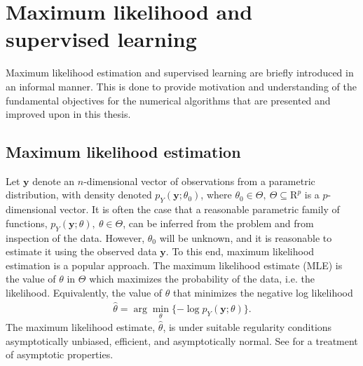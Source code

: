 \chapter{Maximum likelihood and supervised learning}
\label{chap:ml-and-sl}

Maximum likelihood estimation and supervised learning are briefly introduced in an informal manner. %
This is done to provide motivation and understanding of the fundamental objectives for the numerical algorithms that are presented and improved upon in this thesis.


\section{Maximum likelihood estimation}

Let $\mathbf{y}$ denote an $n$-dimensional vector of observations from a parametric distribution, with density denoted $p_Y(\mathbf{y};\theta_0)$, where $\theta_0\in \Theta,~\Theta\subseteq \mathrm{R}^p$ is a $p$-dimensional vector.
It is often the case that a reasonable parametric family of functions, $p_Y(\mathbf{y};\theta),~\theta\in \Theta$, can be inferred from the problem and from inspection of the data.
However, $\theta_0$ will be unknown, and it is reasonable to estimate it using the observed data $\mathbf{y}$.
To this end, maximum likelihood estimation is a popular approach.
The maximum likelihood estimate (MLE) is the value of $\theta$ in $\Theta$ which maximizes the probability of the data, i.e. the likelihood.
Equivalently, the value of $\theta$ that minimizes the negative log likelihood
\begin{align}\label{eq:mle}
	\hat{\theta} = \arg\min_\theta \{-\log p_Y(\mathbf{y};\theta)\}.
\end{align}
The maximum likelihood estimate, $\hat{\theta}$, is under suitable regularity conditions asymptotically unbiased, efficient, and asymptotically normal.
See \citet{vanDerVaart} for a treatment of asymptotic properties.


